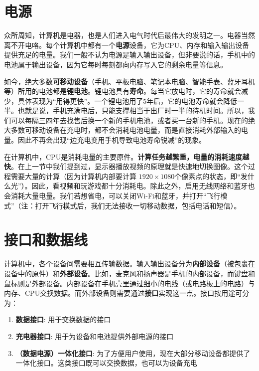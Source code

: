 \section{电源}\label{sec:arch:battery}

众所周知，计算机是电器，也是人们进入电气时代后最伟大的发明之一。电器当然离不开电咯。每个计算机中都有一个\textbf{电源}设备，它为CPU、内存和输入输出设备提供充足的电量。我们一般不认为电源是输入输出设备，但非要说的话，手机中的电池属于输出设备，因为它每时每刻都向内存写入它的剩余电量等信息。

如今，绝大多数\textbf{可移动设备}（手机、平板电脑、笔记本电脑、智能手表、蓝牙耳机等）所用的电池都是\textbf{锂电池}。锂电池具有\textbf{寿命}。每当它放电时，它的寿命就会减少，具体表现为“用得更快”。一个锂电池用了5年后，它的电池寿命就会降低一半。也就是说，手机充满电后，只能支撑相当于出厂时一半的待机时间。所以，我们可以每隔三四年去找售后换一个新的手机电池，或者买一台新的手机。现在的绝大多数可移动设备在充电时，都不会消耗电池电量，而是直接消耗外部输入的电量。因此不再会出现“边充电变用手机导致电池寿命锐减”的现象。

在计算机中，CPU是消耗电量的主要原件。\textbf{计算任务越繁重，电量的消耗速度越快}。在上一节中我们提到过，显示器播放视频的原理就是快速地切换图像。这个过程需要大量的计算（因为计算机内部要计算 $1920 \times 1080$个像素点的状态，即“发什么光”）。因此，看视频和玩游戏都十分消耗电。除此之外，启用无线网络和蓝牙也会消耗大量电量。我们若想省电，可以关闭Wi-Fi和蓝牙，并打开“飞行模式”（注：打开飞行模式后，我们无法接收一切移动数据，包括电话和短信）。


\section{接口和数据线}\label{sec:arch:interfaces_cables}

计算机中，各个设备间需要相互传输数据。输入输出设备分为\textbf{内部设备}（被包裹在设备中的原件）和\textbf{外部设备}。比如，麦克风和扬声器是手机的内部设备，而键盘和鼠标则是外部设备。内部设备在手机壳里通过细小的电线（或电路板上的电路）与内存、CPU交换数据。而外部设备则需要通过\textbf{接口}实现这一点。接口按用途可分为：

\begin{enumerate}
    \item { \textbf{数据接口}: 用于交换数据的接口 }
    \item { \textbf{充电器接口}: 用于为设备和电池提供外部电源的接口 }
    \item { \textbf{（数据电源）一体化接口}: 为了方便用户使用，现在大部分移动设备都提供了一体化接口。这类接口既可以交换数据，也可以为设备充电 }
\end{enumerate}


